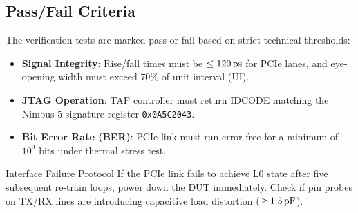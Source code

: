 \subsection{Pass/Fail Criteria}
The verification tests are marked pass or fail based on strict technical thresholds:
\begin{itemize}
    \item \textbf{Signal Integrity}: Rise/fall times must be $\le 120\text{\,ps}$ for PCIe lanes, and eye-opening width must exceed $70\%$ of unit interval (UI).
    \item \textbf{JTAG Operation}: TAP controller must return IDCODE matching the Nimbus-5 signature register \texttt{0x0A5C2043}.
    \item \textbf{Bit Error Rate (BER)}: PCIe link must run error-free for a minimum of $10^9$ bits under thermal stress test.
\end{itemize}

\begin{warningbox}{Interface Failure Protocol}
If the PCIe link fails to achieve L0 state after five subsequent re-train loops, power down the DUT immediately. Check if pin probes on TX/RX lines are introducing capacitive load distortion ($\ge 1.5\text{\,pF}$).
\end{warningbox}
